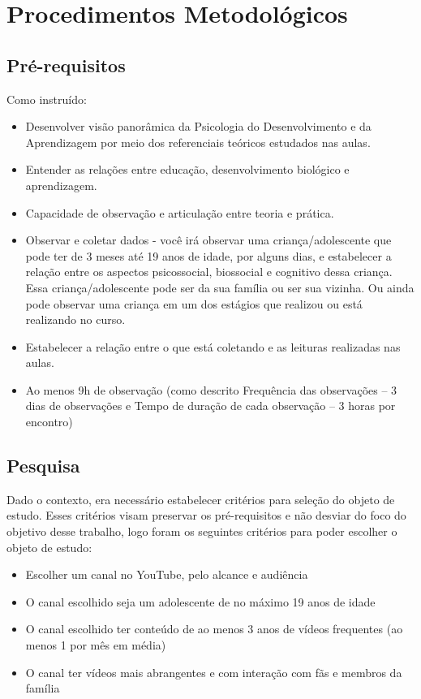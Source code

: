 \chapter{Procedimentos Metodológicos}

\section{Pré-requisitos}

Como instruído:
\begin{itemize}
    \item Desenvolver visão panorâmica da Psicologia do Desenvolvimento e da Aprendizagem por meio dos referenciais teóricos estudados nas aulas.
    \item Entender as relações entre educação, desenvolvimento biológico e aprendizagem.
    \item Capacidade de observação e articulação entre teoria e prática.
    \item Observar e coletar dados  - você irá observar uma criança/adolescente que pode ter de 3 meses até 19 anos de idade, por alguns dias,  e estabelecer a relação entre os aspectos psicossocial, biossocial e cognitivo dessa criança. Essa criança/adolescente pode ser da sua família ou ser sua vizinha. Ou ainda pode observar uma criança em um dos estágios que realizou ou está realizando no curso.
    \item Estabelecer a relação entre o que está coletando e as leituras realizadas nas aulas.
    \item Ao menos 9h de observação (como descrito Frequência das observações – 3 dias de observações e Tempo de duração de cada observação – 3 horas por encontro)
\end{itemize}

\section{Pesquisa}

Dado o contexto, era necessário estabelecer critérios para seleção do objeto de estudo. Esses critérios visam preservar os pré-requisitos e não desviar do foco do objetivo desse trabalho, logo foram os seguintes critérios para poder escolher o objeto de estudo:

\begin{itemize}
    \item Escolher um canal no YouTube, pelo alcance e audiência
    \item O canal escolhido seja um adolescente de no máximo 19 anos de idade
    \item O canal escolhido ter conteúdo de ao menos 3 anos de vídeos frequentes (ao menos 1 por mês em média)
    \item O canal ter vídeos mais abrangentes e com interação com fãs e membros da família
\end{itemize}


